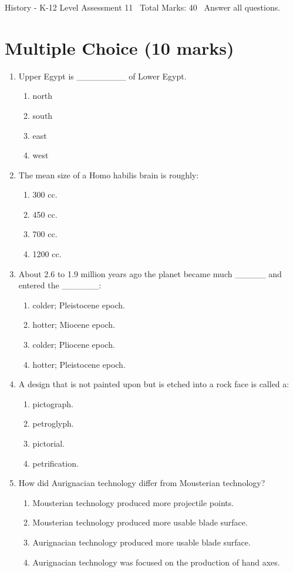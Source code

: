 \documentclass[12pt]{article}
\begin{document}
\begin{center}
History - K-12 Level Assessment 11 \
Total Marks: 40 \
Answer all questions.
\end{center}

\section*{Multiple Choice (10 marks)}
\begin{enumerate}[label=\arabic*.]
\item Upper Egypt is \_\_\_\_\_\_\_\_ of Lower Egypt.
\begin{enumerate}[label=(\alph*)]
    \item north
    \item south
    \item east
    \item west
\end{enumerate}
\item The mean size of a Homo habilis brain is roughly:
\begin{enumerate}[label=(\alph*)]
    \item 300 cc.
    \item 450 cc.
    \item 700 cc.
    \item 1200 cc.
\end{enumerate}
\item About 2.6 to 1.9 million years ago the planet became much \_\_\_\_\_ and entered the \_\_\_\_\_\_:
\begin{enumerate}[label=(\alph*)]
    \item colder; Pleistocene epoch.
    \item hotter; Miocene epoch.
    \item colder; Pliocene epoch.
    \item hotter; Pleistocene epoch.
\end{enumerate}
\item A design that is not painted upon but is etched into a rock face is called a:
\begin{enumerate}[label=(\alph*)]
    \item pictograph.
    \item petroglyph.
    \item pictorial.
    \item petrification.
\end{enumerate}
\item How did Aurignacian technology differ from Mousterian technology?
\begin{enumerate}[label=(\alph*)]
    \item Mousterian technology produced more projectile points.
    \item Mousterian technology produced more usable blade surface.
    \item Aurignacian technology produced more usable blade surface.
    \item Aurignacian technology was focused on the production of hand axes.
\end{enumerate}
\end{enumerate}
\end{document}

